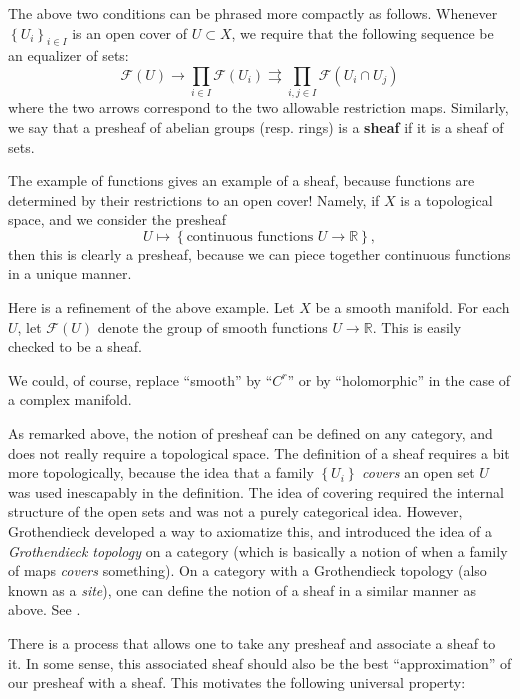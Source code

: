The above two conditions can be phrased more compactly as follows. Whenever
$\left\{U_i\right\}_{i \in I}$ is an open cover of $U \subset X$, we require that the
following sequence be an equalizer of sets:
\[  \mathcal{F}(U) \to \prod_{i \in I} \mathcal{F}(U_i) \rightrightarrows \prod_{i,j \in I}
\mathcal{F}(U_i \cap U_j) \]
where the two arrows correspond to the two allowable restriction maps.
Similarly, we say that a presheaf of abelian groups (resp. rings) is a
\textbf{sheaf} if it is a sheaf of sets.

\begin{example} 
The example of functions gives an example of a sheaf, because functions are
determined by their restrictions to an open cover! Namely, if $X$ is a
topological space, and we consider the presheaf
\[ U \mapsto \left\{\text{continuous functions } U \to \mathbb{R}\right\} , \]
then this is clearly a presheaf, because we can piece together continuous
functions in a unique manner.
\end{example} 

\begin{example} 
Here is a refinement of the above example. Let $X$ be a smooth manifold.
For each $U$, let $\mathcal{F} (U)$ denote the group of smooth functions $U
\to \mathbb{R}$. This is easily checked to be a sheaf.

We could, of course, replace ``smooth'' by ``$C^r$'' or by ``holomorphic'' in
the case of a complex manifold.
\end{example} 


\begin{remark} 
As remarked above, the notion of presheaf can be defined on any category, and
does not really require a topological space. The definition of a sheaf
requires a bit more topologically, because the idea that a family
$\left\{U_i\right\}$ \emph{covers} an open set $U$ was used inescapably in the
definition. The idea of covering required the internal structure of the open
sets and was not a purely categorical idea. However, Grothendieck developed a
way to axiomatize this, and introduced the idea of a \emph{Grothendieck
topology} on a category (which is basically a notion of when a family of maps
\emph{covers} something). On a category with a Grothendieck topology (also
known as a \emph{site}), one can define the notion of a sheaf in a similar
manner as above. See \cite{Vi08}.
\end{remark} 




There is a process that allows one to take any presheaf and
associate a sheaf to it. In some sense, this associated sheaf should also be the best ``approximation'' of our presheaf with a sheaf. This motivates the
following universal property:

